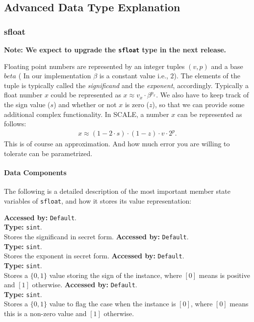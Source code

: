 \subsection{Advanced Data Type Explanation}
\subsubsection{sfloat}
{\bf Note: We expect to upgrade the \verb+sfloat+ type in the next 
release.}

\vspace{5mm}

\noindent
Floating point numbers are represented by an integer tuples $(v,p)$ and a base $beta$ ( In our implementation $\beta$ is a constant value i.e., $2$). The elements of the tuple is typically called  the \textit{significand} and the \textit{exponent}, accordingly. Typically a float number $x$ could be represented as $x \approx v_{x} \cdot \beta^{p_{x}}$. We also have to keep track of the sign value ($s$) and whether or not $x$ is zero ($z$), so that we can provide some additional complex functionality. In SCALE, a number $x$ can be represented as follows: 
	\begin{align}
			x\approx (1-2 \cdot s)\cdot (1-z)\cdot v\cdot 2^{p}.
	\end{align}	  
	This is of course an approximation. And how much error you are willing to tolerate can be parametrized. 
		\paragraph{Data Components}
		The following is a detailed description of the most important member state variables of \verb|sfloat|, and how it stores its value representation:
		
		\textbf{Accessed by:} \verb|Default|.\\
		\textbf{Type:} \verb|sint|.\\
		Stores the significand in secret form.
		\textbf{Accessed by:} \verb|Default|.\\
		\textbf{Type:} \verb|sint|.\\
		Stores the  exponent in secret form.
		\textbf{Accessed by:} \verb|Default|.\\
		\textbf{Type:} \verb|sint|.\\
		Stores a $\{0,1\}$ value storing the sign of the instance, where $[0]$ means is positive and $[1]$ otherwise.		
		\textbf{Accessed by:} \verb|Default|.\\
		\textbf{Type:} \verb|sint|.\\
		Stores a $\{0,1\}$ value to flag the case when the instance is $[0]$, where $[0]$ means this is a non-zero value and $[1]$ otherwise.		

